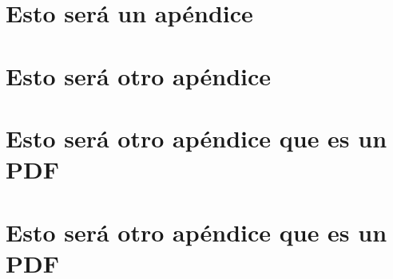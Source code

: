 \documentclass[a4paper,12pt]{book}
\begin{document}
%




\appendix %

\chapter{Esto será un apéndice}\label{Apendice_A}


\chapter{Esto será otro apéndice}\label{Apendice_B}


\chapter{Esto será otro apéndice que es un PDF}\label{Apendice_C}


\chapter{Esto será otro apéndice que es un PDF}\label{Apendice_C}


\newpage %
\thispagestyle{empty} %
\mbox{}

\end{document}
